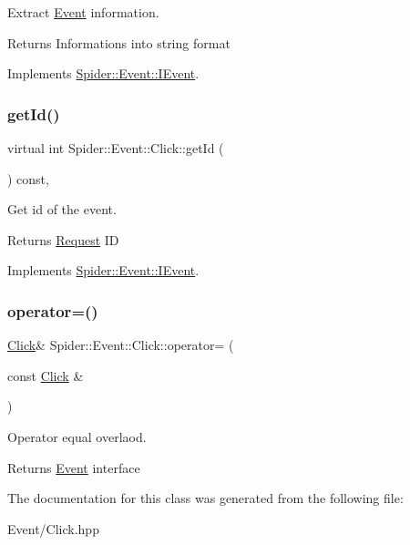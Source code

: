 Extract \hyperlink{namespace_spider_1_1_event}{Event} information. 

\begin{DoxyReturn}{Returns}
Informations into string format 
\end{DoxyReturn}


Implements \hyperlink{class_spider_1_1_event_1_1_i_event_ac8471df73080237faea55de539d968a0}{Spider\+::\+Event\+::\+I\+Event}.

\mbox{\label{class_spider_1_1_event_1_1_click_a32b810199a69b799589b680bfb9c287d}} 
\subsubsection{\texorpdfstring{get\+Id()}{getId()}}
{\footnotesize\ttfamily virtual int Spider\+::\+Event\+::\+Click\+::get\+Id (\begin{DoxyParamCaption}{ }\end{DoxyParamCaption}) const\hspace{0.3cm}{\ttfamily [inline]}, {\ttfamily [virtual]}}



Get id of the event. 

\begin{DoxyReturn}{Returns}
\hyperlink{class_spider_1_1_event_1_1_request}{Request} ID 
\end{DoxyReturn}


Implements \hyperlink{class_spider_1_1_event_1_1_i_event_a902d1376faa8e5948fa5bfe8d7208c88}{Spider\+::\+Event\+::\+I\+Event}.

\mbox{\label{class_spider_1_1_event_1_1_click_a857c3a0ca04ebce50cd170ec30e0a891}} 
\subsubsection{\texorpdfstring{operator=()}{operator=()}}
{\footnotesize\ttfamily \hyperlink{class_spider_1_1_event_1_1_click}{Click}\& Spider\+::\+Event\+::\+Click\+::operator= (\begin{DoxyParamCaption}\item[{const \hyperlink{class_spider_1_1_event_1_1_click}{Click} \&}]{ }\end{DoxyParamCaption})\hspace{0.3cm}{\ttfamily [delete]}}



Operator equal overlaod. 

\begin{DoxyReturn}{Returns}
\hyperlink{namespace_spider_1_1_event}{Event} interface 
\end{DoxyReturn}


The documentation for this class was generated from the following file\+:\begin{DoxyCompactItemize}
\item 
Event/Click.\+hpp\end{DoxyCompactItemize}
